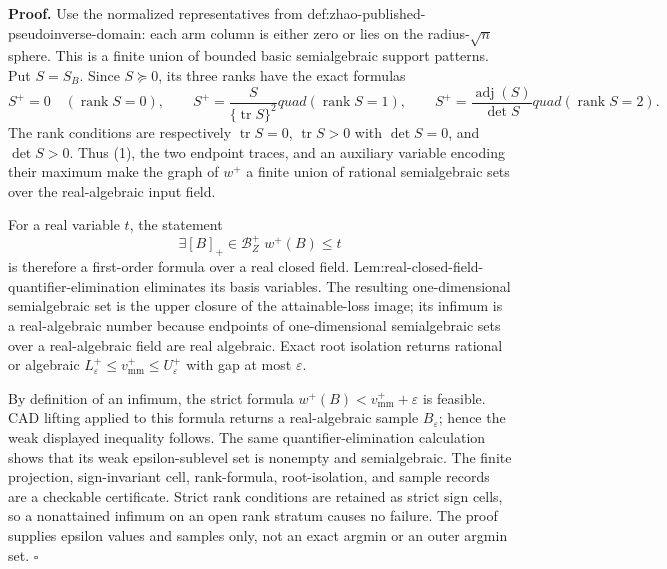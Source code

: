 \textbf{Proof.}
Use the normalized representatives from def:zhao-published-pseudoinverse-domain: each arm column is either zero or lies on the radius-\(\sqrt n\) sphere.  This is a finite union of bounded basic semialgebraic support patterns.  Put \(S=S_B\).  Since \(S\succeq0\), its three ranks have the exact formulas
\[
S^+=0\quad(\operatorname{rank}S=0),
\qquad
S^+=\frac{S}{\{\operatorname{tr}S\}^2}quad(\operatorname{rank}S=1),
\qquad
S^+=\frac{\operatorname{adj}(S)}{\det S}quad(\operatorname{rank}S=2).
\tag{1}
\]
The rank conditions are respectively \(\operatorname{tr}S=0\), \(\operatorname{tr}S>0\) with \(\det S=0\), and \(\det S>0\).  Thus (1), the two endpoint traces, and an auxiliary variable encoding their maximum make the graph of \(w^+\) a finite union of rational semialgebraic sets over the real-algebraic input field.

For a real variable \(t\), the statement
\[
\exists [B]_+\in\mathcal B_Z^+\; w^+(B)\le t
\tag{2}
\]
is therefore a first-order formula over a real closed field.  Lem:real-closed-field-quantifier-elimination eliminates its basis variables.  The resulting one-dimensional semialgebraic set is the upper closure of the attainable-loss image; its infimum is a real-algebraic number because endpoints of one-dimensional semialgebraic sets over a real-algebraic field are real algebraic.  Exact root isolation returns rational or algebraic \(L_\varepsilon^+\le v_{\mathrm{mm}}^+\le U_\varepsilon^+\) with gap at most \(\varepsilon\).

By definition of an infimum, the strict formula \(w^+(B)<v_{\mathrm{mm}}^++\varepsilon\) is feasible.  CAD lifting applied to this formula returns a real-algebraic sample \(B_\varepsilon\); hence the weak displayed inequality follows.  The same quantifier-elimination calculation shows that its weak epsilon-sublevel set is nonempty and semialgebraic.  The finite projection, sign-invariant cell, rank-formula, root-isolation, and sample records are a checkable certificate.  Strict rank conditions are retained as strict sign cells, so a nonattained infimum on an open rank stratum causes no failure.  The proof supplies epsilon values and samples only, not an exact argmin or an outer argmin set. \(\square\)